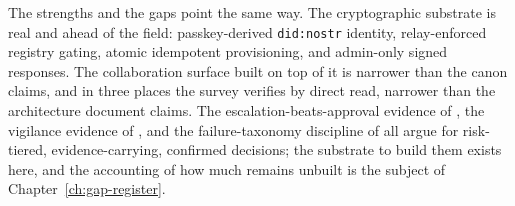 The strengths and the gaps point the same way. The cryptographic substrate is real and ahead of the field: passkey-derived \texttt{did:nostr} identity, relay-enforced registry gating, atomic idempotent provisioning, and admin-only signed responses. The collaboration surface built on top of it is narrower than the canon claims, and in three places the survey verifies by direct read, narrower than the architecture document claims. The escalation-beats-approval evidence of \textcite{Pereira2026Playbook}, the vigilance evidence of \textcite{DellAcqua2023}, and the failure-taxonomy discipline of \textcite{Cemri2025} all argue for risk-tiered, evidence-carrying, confirmed decisions; the substrate to build them exists here, and the accounting of how much remains unbuilt is the subject of Chapter~\ref{ch:gap-register}.
